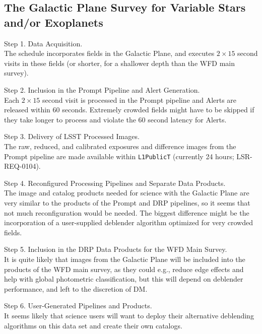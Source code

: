 \documentclass[DM,lsstdoc,toc]{lsstdoc}
\begin{document}
\subsection{The Galactic Plane Survey for Variable Stars and/or Exoplanets}\label{ssec:SPCS_GPVSEx}

Step 1. Data Acquisition. \\
The schedule incorporates fields in the Galactic Plane, and executes $2\times15$ second visits in these fields (or shorter, for a shallower depth than the WFD main survey).

Step 2. Inclusion in the Prompt Pipeline and Alert Generation. \\
Each $2\times15$ second visit is processed in the Prompt pipeline and Alerts are released within 60 seconds. Extremely crowded fields might have to be skipped if they take longer to process and violate the $60$ second latency for Alerts. 

Step 3. Delivery of LSST Processed Images. \\
The raw, reduced, and calibrated exposures and difference images from the Prompt pipeline are made available within  \texttt{L1PublicT} (currently 24 hours; LSR-REQ-0104).

Step 4. Reconfigured Processing Pipelines and Separate Data Products. \\
The image and catalog products needed for science with the Galactic Plane are very similar to the products of the Prompt and DRP pipelines, so it seems that not much reconfiguration would be needed. The biggest difference might be the incorporation of a user-supplied deblender algorithm optimized for very crowded fields.

Step 5. Inclusion in the DRP Data Products for the WFD Main Survey. \\
It is quite likely that images from the Galactic Plane will be included into the products of the WFD main survey, as they could e.g., reduce edge effects and help with global photometric classification, but this will depend on deblender performance, and left to the discretion of DM. 

Step 6. User-Generated Pipelines and Products. \\
It seems likely that science users will want to deploy their alternative deblending algorithms on this data set and create their own catalogs.

%


\clearpage

\end{document}
